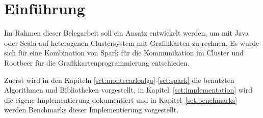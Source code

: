\chapter{Einführung}

Im Rahmen dieser Belegarbeit soll ein Ansatz entwickelt werden, um mit Java oder Scala auf heterogenen Clustersystem mit Grafikkarten zu rechnen. Es wurde sich für eine Kombination von Spark für die Kommunikation im Cluster und Rootbeer für die Grafikkartenprogrammierung entschieden.

Zuerst wird in den Kapiteln \ref{sct:montecarloalgo}-\ref{sct:spark} die benutzten Algorithmen und Bibliotheken vorgestellt, in Kapitel~\ref{sct:implementation} wird die eigene Implementierung dokumentiert und in Kapitel~\ref{sct:benchmarks} werden Benchmarks dieser Implementierung vorgestellt.

